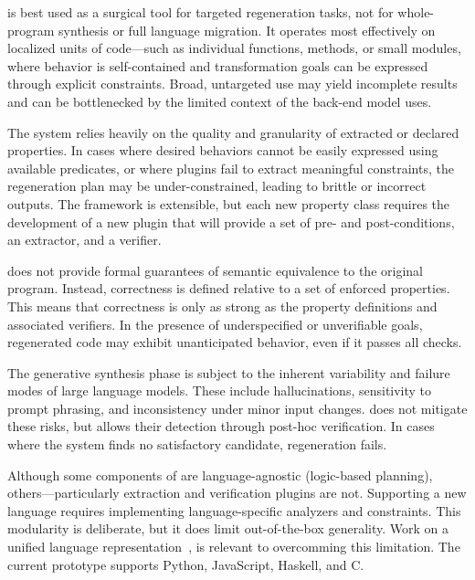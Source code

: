\documentclass[a4paper,twoside,12pt]{report} %
\begin{document}
\sys is best used as a surgical tool for targeted regeneration tasks, not for whole-program synthesis or full language migration.
It operates most effectively on localized units of code---such as individual functions, methods, or small modules, where behavior is self-contained and transformation goals can be expressed through explicit constraints.
Broad, untargeted use may yield incomplete results and can be bottlenecked by the limited context of the back-end model \sys uses.

The system relies heavily on the quality and granularity of extracted or declared properties.
In cases where desired behaviors cannot be easily expressed using available predicates, or where plugins fail to extract meaningful constraints, the regeneration plan may be under-constrained, leading to brittle or incorrect outputs. The framework is extensible, but each new property class requires the development of a new plugin that will provide a set of pre- and post-conditions, an extractor, and a verifier.

\sys
does not provide formal guarantees
of semantic equivalence
to the original program.
Instead,
correctness is defined relative to a set of enforced properties.
This means that correctness is only as strong as the property definitions and associated verifiers.
In the presence of underspecified or unverifiable goals,
regenerated code
may exhibit unanticipated behavior,
even if it passes all checks. 


The generative synthesis phase
is subject to the inherent variability and failure modes
of large language models.
These include hallucinations,
sensitivity to prompt phrasing,
and inconsistency
under minor input changes.
\sys does not mitigate these risks,
but allows their detection
through post-hoc verification.
In cases where the system finds no satisfactory candidate,
regeneration fails.


Although some components of \sys are language-agnostic (\eg logic-based planning),
others---particularly extraction and verification plugins are not.
Supporting a new language
requires implementing language-specific analyzers and constraints.
This modularity is deliberate,
but it does limit out-of-the-box generality.
Work on a unified language representation~\cite{koppel2018onetool,bap2011,dillig2009sail},
is relevant to overcomming this limitation.
The current \sys prototype
supports Python, JavaScript, Haskell, and C. 
\end{document}
